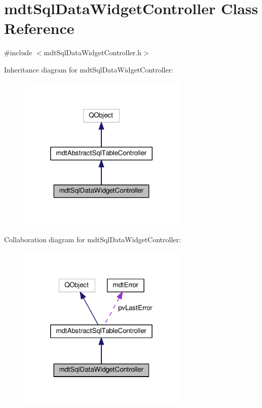 \hypertarget{classmdt_sql_data_widget_controller}{\section{mdt\-Sql\-Data\-Widget\-Controller Class Reference}
\label{classmdt_sql_data_widget_controller}
}


{\ttfamily \#include $<$mdt\-Sql\-Data\-Widget\-Controller.\-h$>$}



Inheritance diagram for mdt\-Sql\-Data\-Widget\-Controller\-:
\nopagebreak
\begin{figure}[H]
\begin{center}
\leavevmode
\includegraphics[width=228pt]{classmdt_sql_data_widget_controller__inherit__graph}
\end{center}
\end{figure}


Collaboration diagram for mdt\-Sql\-Data\-Widget\-Controller\-:
\nopagebreak
\begin{figure}[H]
\begin{center}
\leavevmode
\includegraphics[width=230pt]{classmdt_sql_data_widget_controller__coll__graph}
\end{center}
\end{figure}
